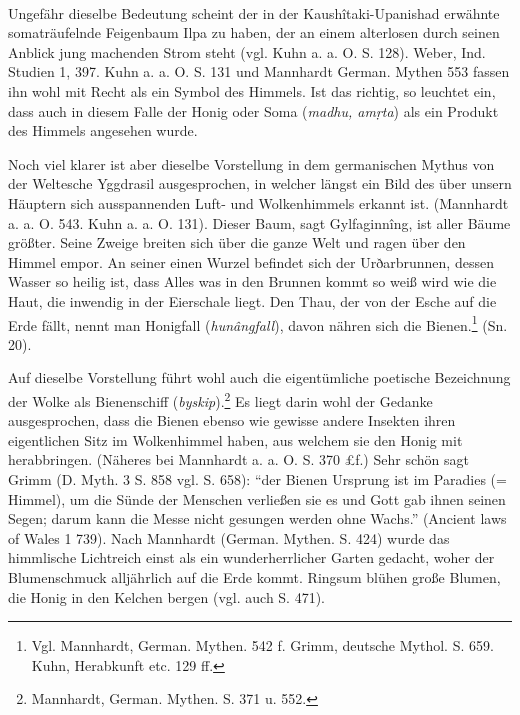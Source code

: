 \documentclass[a4paper, 11pt, oneside]{article}
\begin{document}
\paragraph{}
Ungefähr dieselbe Bedeutung scheint der in der Kaushîtaki-Upanishad erwähnte somaträufelnde Feigenbaum Ilpa zu haben, der an einem alterlosen durch seinen Anblick jung machenden Strom steht (vgl. Kuhn a. a. O. S. 128). Weber, Ind. Studien 1, 397. Kuhn a. a. O. S. 131 und Mannhardt German. Mythen 553 fassen ihn wohl mit Recht als ein Symbol des Himmels. Ist das richtig, so leuchtet ein, dass auch in diesem Falle der Honig oder Soma (\emph{madhu, amṛta}) als ein Produkt des Himmels angesehen wurde.

Noch viel klarer ist aber dieselbe Vorstellung in dem germanischen Mythus von der Weltesche Yggdrasil ausgesprochen, in welcher längst ein Bild des über unsern Häuptern sich ausspannenden Luft- und Wolkenhimmels erkannt ist. (Mannhardt a. a. O. 543. Kuhn a. a. O. 131). Dieser Baum, sagt Gylfaginnîng, ist aller Bäume größter. Seine Zweige breiten sich über die ganze Welt und ragen über den Himmel empor. An seiner einen Wurzel befindet sich der Urðarbrunnen, dessen Wasser so heilig ist, dass Alles was in den Brunnen kommt so weiß wird wie die Haut, die inwendig in der Eierschale liegt. Den Thau, der von der Esche auf die Erde fällt, nennt man Honigfall (\emph{hunângfall}), davon nähren sich die Bienen.\footnote{Vgl. Mannhardt, German. Mythen. 542 f. Grimm, deutsche Mythol. S. 659. Kuhn, Herabkunft etc. 129 ff.} (Sn. 20).

Auf dieselbe Vorstellung führt wohl auch die eigentümliche poetische Bezeichnung der Wolke als Bienenschiff (\emph{byskip}).\footnote{Mannhardt, German. Mythen. S. 371 u. 552.} Es liegt darin wohl der Gedanke ausgesprochen, dass die Bienen ebenso wie gewisse andere Insekten ihren eigentlichen Sitz im Wolkenhimmel haben, aus welchem sie den Honig mit herabbringen. (Näheres bei Mannhardt a. a. O. S. 370 £f.) Sehr schön sagt Grimm (D. Myth. 3 S. 858 vgl. S. 658): "`der Bienen Ursprung ist im Paradies (= Himmel), um die Sünde der Menschen verließen sie es und Gott gab ihnen seinen Segen; darum kann die Messe nicht gesungen werden ohne Wachs."' (Ancient laws of Wales 1 739). Nach Mannhardt (German. Mythen. S. 424) wurde das himmlische Lichtreich einst als ein wunderherrlicher Garten gedacht, woher der Blumenschmuck alljährlich auf die Erde kommt. Ringsum blühen große Blumen, die Honig in den Kelchen bergen (vgl. auch S. 471).
\end{document}
